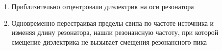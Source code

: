 \begin{frame}[c]
\begin{columns}[t]
\begin{column}{0.49\textwidth}
\begin{figure}[H]
				\label{fig:chem}
			\end{figure}
		\end{column}
		\begin{column}{0.49\textwidth}%
			\begin{enumerate}
				\item Приблизительно отцентровали диэлектрик на оси резонатора
				\item Одновременно перестраивая пределы свипа по частоте источника и изменяя длину резонатора, нашли резонансную частоту, при которой смещение диэлектрика не вызывает смещения резонансного пика
			\end{enumerate}
		\end{column}
	\end{columns}
		
\end{frame}

